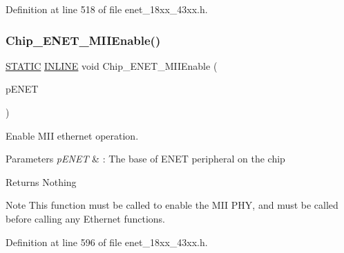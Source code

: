Definition at line 518 of file enet\+\_\+18xx\+\_\+43xx.\+h.

\mbox{\label{group___e_n_e_t__18_x_x__43_x_x_gaed6cdc51afaeb89d7bb465bcfc7ddf2e}} 
\subsubsection{\texorpdfstring{Chip\+\_\+\+E\+N\+E\+T\+\_\+\+M\+I\+I\+Enable()}{Chip\_ENET\_MIIEnable()}}
{\footnotesize\ttfamily \hyperlink{group___l_p_c___types___public___macros_ga10b2d890d871e1489bb02b7e70d9bdfb}{S\+T\+A\+T\+IC} \hyperlink{spifi__18xx__43xx_8h_a2eb6f9e0395b47b8d5e3eeae4fe0c116}{I\+N\+L\+I\+NE} void Chip\+\_\+\+E\+N\+E\+T\+\_\+\+M\+I\+I\+Enable (\begin{DoxyParamCaption}\item[{\hyperlink{struct_l_p_c___e_n_e_t___t}{L\+P\+C\+\_\+\+E\+N\+E\+T\+\_\+T} $\ast$}]{p\+E\+N\+ET }\end{DoxyParamCaption})}



Enable M\+II ethernet operation. 


\begin{DoxyParams}{Parameters}
{\em p\+E\+N\+ET} & \+: The base of E\+N\+ET peripheral on the chip \\
\hline
\end{DoxyParams}
\begin{DoxyReturn}{Returns}
Nothing 
\end{DoxyReturn}
\begin{DoxyNote}{Note}
This function must be called to enable the M\+II P\+HY, and must be called before calling any Ethernet functions. 
\end{DoxyNote}


Definition at line 596 of file enet\+\_\+18xx\+\_\+43xx.\+h.

\mbox{\label{group___e_n_e_t__18_x_x__43_x_x_ga47f1d10185cb9ed0c484c9fd3ac07423}} 
